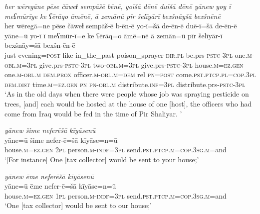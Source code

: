 \ea \label{BP.40}
\textit{her wēregāne pēse čāweɫ sempāšē bēnē, yoīšā dēnē duīšā dēnē yānew yoy ī meʕmūrīye ke ʕērāqo āmēnē, ā zemānū pīr šelīyārī bexšnāyšā bexšnēnē} \\ 
\gll her wēregā=ne pēse čāweɫ sempāš-ē b-ēn-ē yo-ī=šā de-ēn-ē duē-ī=šā de-ēn-ē yāne=ū yo-ī ī meʕmūr-ī=e ke ʕērāq=o āmē=nē ā zemān=ū pīr šelīyār-ī bexšnāy=šā bexšn-ēn-ē \\ 
 just evening\textsc{=\textsc{post}} like in\_the\_past poison\_sprayer\textsc{-dir}\textsc{.pl} be.prs\textsc{-pstc}\textsc{-3pl} one\textsc{.m}\textsc{-obl}\textsc{.m}\textsc{=3pl} give.prs\textsc{-pstc}\textsc{-3pl} two\textsc{-obl}\textsc{.m}\textsc{=3pl} give.prs\textsc{-pstc}\textsc{-3pl} house\textsc{.m}\textsc{=ez.gen} one\textsc{.m}\textsc{-obl}\textsc{.m} \textsc{dem.prox} officer\textsc{.m}\textsc{-obl}\textsc{.m}\textsc{=dem} rel \textsc{pn}\textsc{=\textsc{post}} come\textsc{.pst}\textsc{.ptcp}\textsc{.pl}\textsc{=cop}\textsc{.3pl} \textsc{dem.dist} time\textsc{.m}\textsc{=ez.gen} \textsc{pn} \textsc{pn}\textsc{-obl}\textsc{.m} distribute\textsc{.inf}\textsc{=3pl} distribute.prs\textsc{-pstc}\textsc{-3pl} \\ 
\glt `As in the old days when there were people whose job was spraying pesticide on trees, [and] each would be hosted at the house of one [host], the officers who had come from Iraq would be fed in the time of Pir Shaliyar. '
\z 
 
\ea \label{BP.41}
\textit{yānew šime neferēšā kīyāsenū} \\ 
\gll yāne=ū šime nefer-ē=šā kīyāse=n=ū \\ 
 house\textsc{.m}\textsc{=ez.gen} \textsc{2pl} person\textsc{.m}\textsc{-indf}\textsc{=3pl} send\textsc{.pst}\textsc{.ptcp}\textsc{.m}\textsc{=cop}\textsc{.3sg}\textsc{.m}=and \\ 
\glt `[For instance] One [tax collector] would be sent to your house;'
\z 
 
\ea \label{BP.42}
\textit{yānew ēme neferēšā kīyāsenū} \\ 
\gll yāne=ū ēme nefer-ē=šā kīyāse=n=ū \\ 
 house\textsc{.m}\textsc{=ez.gen} \textsc{1pl} person\textsc{.m}\textsc{-indf}\textsc{=3pl} send\textsc{.pst}\textsc{.ptcp}\textsc{.m}\textsc{=cop}\textsc{.3sg}\textsc{.m}=and \\ 
\glt `One [tax collector] would be sent to our house;'
\z 
 
